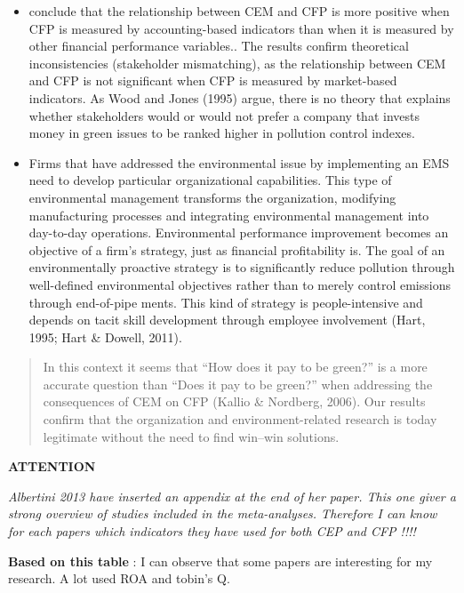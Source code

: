 \documentclass[]{article}
\begin{document}
\begin{itemize}
\item
  conclude that the relationship between CEM and CFP is more positive
  when CFP is measured by accounting-based indicators than when it is
  measured by other financial performance variables.. The results
  confirm theoretical inconsistencies (stakeholder mismatching), as the
  relationship between CEM and CFP is not significant when CFP is
  measured by market-based indicators. As Wood and Jones (1995) argue,
  there is no theory that explains whether stakeholders would or would
  not prefer a company that invests money in green issues to be ranked
  higher in pollution control indexes.
\item
  Firms that have addressed the environmental issue by implementing an
  EMS need to develop particular organizational capabilities. This type
  of environmental management transforms the organization, modifying
  manufacturing processes and integrating environmental management into
  day-to-day operations. Environmental performance improvement becomes
  an objective of a firm's strategy, just as financial profitability is.
  The goal of an environmentally proactive strategy is to significantly
  reduce pollution through well-defined environmental objectives rather
  than to merely control emissions through end-of-pipe ments. This kind
  of strategy is people-intensive and depends on tacit skill development
  through employee involvement (Hart, 1995; Hart \& Dowell, 2011).
\end{itemize}

\begin{quote}
In this context it seems that ``How does it pay to be green?'' is a more
accurate question than ``Does it pay to be green?'' when addressing the
consequences of CEM on CFP (Kallio \& Nordberg, 2006). Our results
confirm that the organization and environment-related research is today
legitimate without the need to find win--win solutions.
\end{quote}

\textbf{ATTENTION}

\emph{Albertini 2013 have inserted an appendix at the end of her paper.
This one giver a strong overview of studies included in the
meta-analyses. Therefore I can know for each papers which indicators
they have used for both CEP and CFP !!!!}

\textbf{Based on this table} : I can observe that some papers are
interesting for my research. A lot used ROA and tobin's Q.
\end{document}
